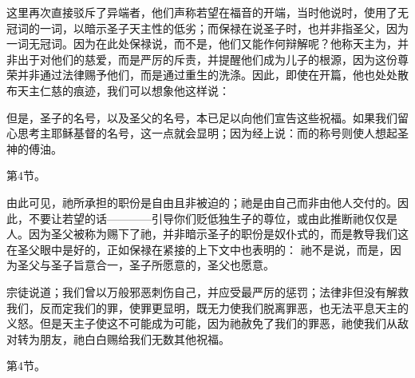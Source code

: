 \par

这里再次直接驳斥了异端者，他们声称若望在福音的开端，当时他说时，使用了无冠词的一词，以暗示圣子天主性的低劣；而保禄在说圣子时，也并非指圣父，因为一词无冠词。因为在此处保禄说，而不是，他们又能作何辩解呢？他称天主为，并非出于对他们的慈爱，而是严厉的斥责，并提醒他们成为儿子的根源，因为这份尊荣并非通过法律赐予他们，而是通过重生的洗涤。因此，即使在开篇，他也处处散布天主仁慈的痕迹，我们可以想象他这样说：\par

但是，圣子的名号，以及圣父的名号，本已足以向他们宣告这些祝福。如果我们留心思考主耶稣基督的名号，这一点就会显明；因为经上说：而的称号则使人想起圣神的傅油。\par

第4节。\par

由此可见，祂所承担的职份是自由且非被迫的；祂是由自己而非由他人交付的。因此，不要让若望的话————引导你们贬低独生子的尊位，或由此推断祂仅仅是人。因为圣父被称为赐下了祂，并非暗示圣子的职份是奴仆式的，而是教导我们这在圣父眼中是好的，正如保禄在紧接的上下文中也表明的： 祂不是说，而是，因为圣父与圣子旨意合一，圣子所愿意的，圣父也愿意。\par

宗徒说道；我们曾以万般邪恶刺伤自己，并应受最严厉的惩罚；法律非但没有解救我们，反而定我们的罪，使罪更显明，既无力使我们脱离罪恶，也无法平息天主的义怒。但是天主子使这不可能成为可能，因为祂赦免了我们的罪恶，祂使我们从敌对转为朋友，祂白白赐给我们无数其他祝福。\par

第4节。\par

